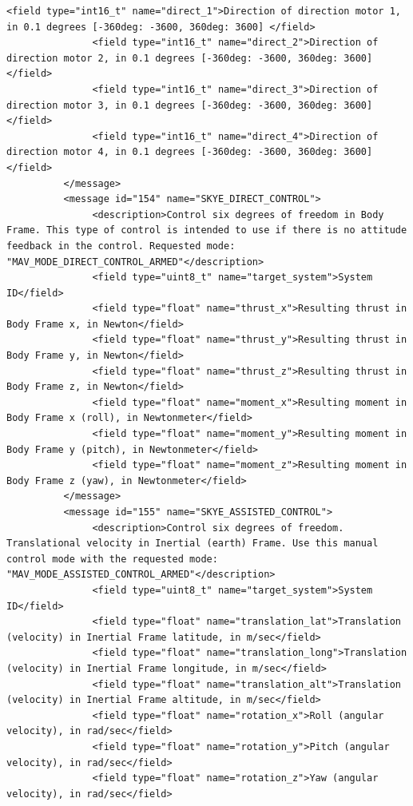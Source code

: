 \begin{lstlisting}[captionpos=b, caption="Definition of \textsc{Skye} specific Mavlink messages", label=app_xml]
               <field type="int16_t" name="direct_1">Direction of direction motor 1, in 0.1 degrees [-360deg: -3600, 360deg: 3600] </field>
               <field type="int16_t" name="direct_2">Direction of direction motor 2, in 0.1 degrees [-360deg: -3600, 360deg: 3600] </field>
               <field type="int16_t" name="direct_3">Direction of direction motor 3, in 0.1 degrees [-360deg: -3600, 360deg: 3600] </field>
               <field type="int16_t" name="direct_4">Direction of direction motor 4, in 0.1 degrees [-360deg: -3600, 360deg: 3600] </field>
          </message>
          <message id="154" name="SKYE_DIRECT_CONTROL">
               <description>Control six degrees of freedom in Body Frame. This type of control is intended to use if there is no attitude feedback in the control. Requested mode: "MAV_MODE_DIRECT_CONTROL_ARMED"</description>
               <field type="uint8_t" name="target_system">System ID</field>
               <field type="float" name="thrust_x">Resulting thrust in Body Frame x, in Newton</field>
               <field type="float" name="thrust_y">Resulting thrust in Body Frame y, in Newton</field>
               <field type="float" name="thrust_z">Resulting thrust in Body Frame z, in Newton</field>
               <field type="float" name="moment_x">Resulting moment in Body Frame x (roll), in Newtonmeter</field>
               <field type="float" name="moment_y">Resulting moment in Body Frame y (pitch), in Newtonmeter</field>
               <field type="float" name="moment_z">Resulting moment in Body Frame z (yaw), in Newtonmeter</field>
          </message>
          <message id="155" name="SKYE_ASSISTED_CONTROL">
               <description>Control six degrees of freedom. Translational velocity in Inertial (earth) Frame. Use this manual control mode with the requested mode: "MAV_MODE_ASSISTED_CONTROL_ARMED"</description>
               <field type="uint8_t" name="target_system">System ID</field>
               <field type="float" name="translation_lat">Translation (velocity) in Inertial Frame latitude, in m/sec</field>
               <field type="float" name="translation_long">Translation (velocity) in Inertial Frame longitude, in m/sec</field>
               <field type="float" name="translation_alt">Translation (velocity) in Inertial Frame altitude, in m/sec</field>
               <field type="float" name="rotation_x">Roll (angular velocity), in rad/sec</field>
               <field type="float" name="rotation_y">Pitch (angular velocity), in rad/sec</field>
               <field type="float" name="rotation_z">Yaw (angular velocity), in rad/sec</field>

\end{lstlisting}
